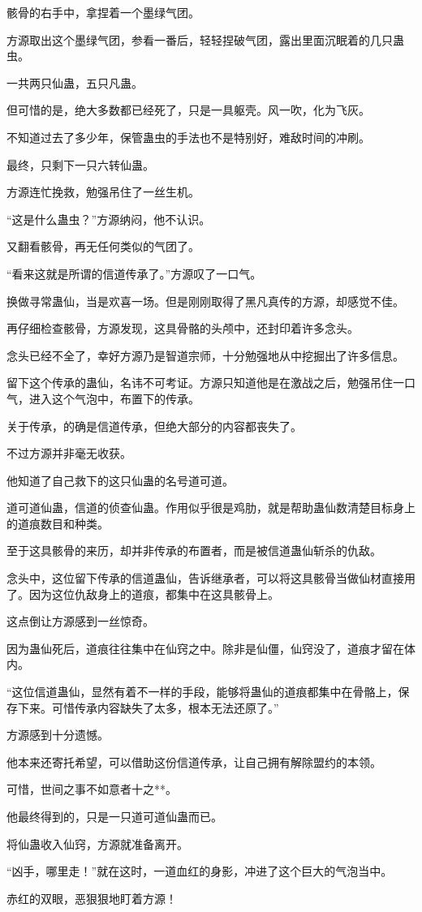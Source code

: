 \begin{this_body}
骸骨的右手中，拿捏着一个墨绿气团。

方源取出这个墨绿气团，参看一番后，轻轻捏破气团，露出里面沉眠着的几只蛊虫。

一共两只仙蛊，五只凡蛊。

但可惜的是，绝大多数都已经死了，只是一具躯壳。风一吹，化为飞灰。

不知道过去了多少年，保管蛊虫的手法也不是特别好，难敌时间的冲刷。

最终，只剩下一只六转仙蛊。

方源连忙挽救，勉强吊住了一丝生机。

“这是什么蛊虫？”方源纳闷，他不认识。

又翻看骸骨，再无任何类似的气团了。

“看来这就是所谓的信道传承了。”方源叹了一口气。

换做寻常蛊仙，当是欢喜一场。但是刚刚取得了黑凡真传的方源，却感觉不佳。

再仔细检查骸骨，方源发现，这具骨骼的头颅中，还封印着许多念头。

念头已经不全了，幸好方源乃是智道宗师，十分勉强地从中挖掘出了许多信息。

留下这个传承的蛊仙，名讳不可考证。方源只知道他是在激战之后，勉强吊住一口气，进入这个气泡中，布置下的传承。

关于传承，的确是信道传承，但绝大部分的内容都丧失了。

不过方源并非毫无收获。

他知道了自己救下的这只仙蛊的名号道可道。

道可道仙蛊，信道的侦查仙蛊。作用似乎很是鸡肋，就是帮助蛊仙数清楚目标身上的道痕数目和种类。

至于这具骸骨的来历，却并非传承的布置者，而是被信道蛊仙斩杀的仇敌。

念头中，这位留下传承的信道蛊仙，告诉继承者，可以将这具骸骨当做仙材直接用了。因为这位仇敌身上的道痕，都集中在这具骸骨上。

这点倒让方源感到一丝惊奇。

因为蛊仙死后，道痕往往集中在仙窍之中。除非是仙僵，仙窍没了，道痕才留在体内。

“这位信道蛊仙，显然有着不一样的手段，能够将蛊仙的道痕都集中在骨骼上，保存下来。可惜传承内容缺失了太多，根本无法还原了。”

方源感到十分遗憾。

他本来还寄托希望，可以借助这份信道传承，让自己拥有解除盟约的本领。

可惜，世间之事不如意者十之**。

他最终得到的，只是一只道可道仙蛊而已。

将仙蛊收入仙窍，方源就准备离开。

“凶手，哪里走！”就在这时，一道血红的身影，冲进了这个巨大的气泡当中。

赤红的双眼，恶狠狠地盯着方源！

\end{this_body}

